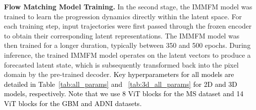 \documentclass[twoside]{article}
\newcommand{\bc}[1]{\textcolor{black}{#1}}
\begin{document}
\textbf{Flow Matching Model Training.} In the second stage, the IMMFM model was trained to learn the progression dynamics directly within the latent space. For each training step, input trajectories were first passed through the frozen encoder to obtain their corresponding latent representations. The IMMFM model was then trained for a longer duration, typically between 350 and 500 epochs. During inference, the trained IMMFM model operates on the latent vectors to produce a forecasted latent state, which is subsequently transformed back into the pixel domain by the pre-trained decoder.
\bc{
Key hyperparameters for all models are detailed in Table~\ref{tab:all_params} and ~\ref{tab:3d_all_params} for 2D and 3D models, respectively. Note that we use 8 ViT blocks for the MS dataset and 14 ViT blocks for the GBM and ADNI datasets.}


\vspace{0.5cm}
\end{document}
